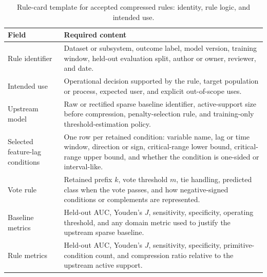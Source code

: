 \begin{table}[p]
    \caption[Rule-card template: identity, rule logic, and intended use.]{Rule-card template for accepted compressed rules: identity, rule logic, and intended use.}
    \label{tab:rule_card_template_logic}
    \centering
    {
    \setlength{\tabcolsep}{3pt}
    \renewcommand{\arraystretch}{0.97}
    \begin{tabularx}{\textwidth}{>{\RaggedRight\arraybackslash}p{}>{\RaggedRight\arraybackslash}X}
        Field & Required content \\ \hline
        Rule identifier & Dataset or subsystem, outcome label, model version, training window, held-out evaluation split, author or owner, reviewer, and date. \\ \hline
        Intended use & Operational decision supported by the rule, target population or process, expected user, and explicit out-of-scope uses. \\ \hline
        Upstream model & Raw or rectified sparse baseline identifier, active-support size before compression, penalty-selection rule, and training-only threshold-estimation policy. \\ \hline
        Selected feature-lag conditions & One row per retained condition: variable name, lag or time window, direction or sign, critical-range lower bound, critical-range upper bound, and whether the condition is one-sided or interval-like. \\ \hline
        Vote rule & Retained prefix $k$, vote threshold $m$, tie handling, predicted class when the vote passes, and how negative-signed conditions or complements are represented. \\ \hline
        Baseline metrics & Held-out AUC, Youden's $J$, sensitivity, specificity, operating threshold, and any domain metric used to justify the upstream sparse baseline. \\ \hline
        Rule metrics & Held-out AUC, Youden's $J$, sensitivity, specificity, primitive-condition count, and compression ratio relative to the upstream active support. \\ \hline
    \end{tabularx}
    }
\end{table}

